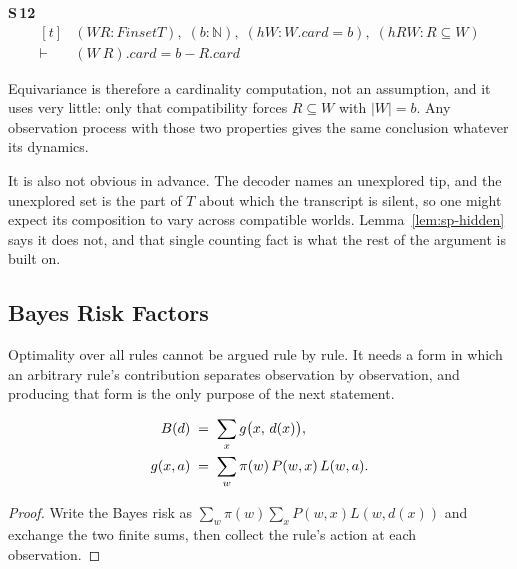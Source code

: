 \noindent\textbf{S\,12}\quad{}
{\footnotesize\[ \begin{aligned}[t]
&(\mathit{W} \mathit{R} : \mathit{Finset} \mathit{T}),\; (\mathit{b} : \mathbb{N} ),\; (\mathit{hW} : \mathit{W}.\mathit{card} = \mathit{b}),\; (\mathit{hRW} : \mathit{R} \subseteq \mathit{W})\\
\vdash\;&(\mathit{W} \ \mathit{R}).\mathit{card} = \mathit{b} - \mathit{R}.\mathit{card}
\end{aligned} \]}


Equivariance is therefore a cardinality computation, not an assumption, and it uses very
little: only that compatibility forces $R\subseteq W$ with $|W|=b$. Any observation process
with those two properties gives the same conclusion whatever its dynamics.

It is also not obvious in advance. The decoder names an unexplored tip, and the unexplored set
is the part of $T$ about which the transcript is silent, so one might expect its composition
to vary across compatible worlds. Lemma~\ref{lem:sp-hidden} says it does not, and that single
counting fact is what the rest of the argument is built on.

\subsection{Bayes Risk Factors}
\label{sec:sp-bayes}

Optimality over all rules cannot be argued rule by rule. It needs a form in which an arbitrary
rule's contribution separates observation by observation, and producing that form is the only
purpose of the next statement.

\begin{theorem}[Factorisation]
\label{thm:sp-factor}
\begin{align}
B(d)&\;=\;\sum_{x} g\bigl(x,\,d(x)\bigr),\notag\\
g(x,a)&\;=\;\sum_{w}\pi(w)\,P(w,x)\,L(w,a).
\label{eq:sp-bayes}
\end{align}
\end{theorem}

\begin{proof}
Write the Bayes risk as $\sum_{w}\pi(w)\sum_{x}P(w,x)L(w,d(x))$ and exchange the two finite
sums, then collect the rule's action at each observation.
\end{proof}

